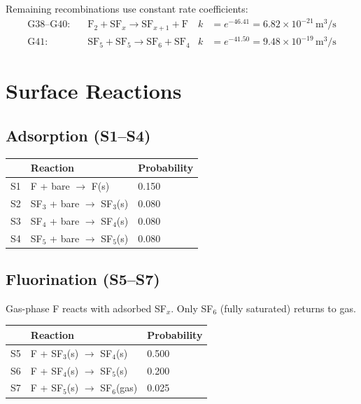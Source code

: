 \documentclass[11pt,a4paper]{article}
\begin{document}
Remaining recombinations use constant rate coefficients:
\begin{align}
  \text{G38--G40:} &\quad \text{F}_2 + \text{SF}_x \to \text{SF}_{x+1} + \text{F}  & k &= e^{-46.41} = 6.82\times10^{-21}\,\text{m}^3/\text{s} \\
  \text{G41:} &\quad \text{SF}_5 + \text{SF}_5 \to \text{SF}_6 + \text{SF}_4  & k &= e^{-41.50} = 9.48\times10^{-19}\,\text{m}^3/\text{s}
\end{align}

\section{Surface Reactions}

\subsection{Adsorption (S1--S4)}

\begin{tabular}{cll}
\toprule
& \textbf{Reaction} & \textbf{Probability} \\
\midrule
S1 & F + bare $\to$ F(s)         & 0.150 \\
S2 & SF$_3$ + bare $\to$ SF$_3$(s)   & 0.080 \\
S3 & SF$_4$ + bare $\to$ SF$_4$(s)   & 0.080 \\
S4 & SF$_5$ + bare $\to$ SF$_5$(s)   & 0.080 \\
\bottomrule
\end{tabular}

\subsection{Fluorination (S5--S7)}

Gas-phase F reacts with adsorbed SF$_x$. Only SF$_6$ (fully saturated) returns to gas.

\begin{tabular}{cll}
\toprule
& \textbf{Reaction} & \textbf{Probability} \\
\midrule
S5 & F + SF$_3$(s) $\to$ SF$_4$(s)   & 0.500 \\
S6 & F + SF$_4$(s) $\to$ SF$_5$(s)   & 0.200 \\
S7 & F + SF$_5$(s) $\to$ SF$_6$(gas) & 0.025 \\
\bottomrule
\end{tabular}
\end{document}
